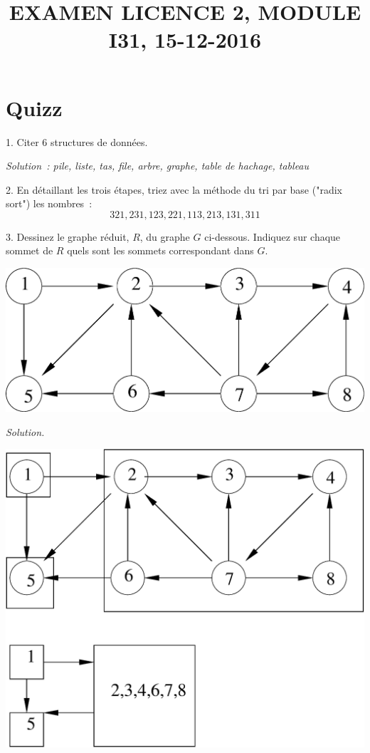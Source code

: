 \documentclass[11pt]{article}
\begin{document}
\title{EXAMEN LICENCE 2, MODULE I31, 15-12-2016}
\date{}

\maketitle
\newif\ifcorrige
\corrigetrue

\newcommand{\smallbullet}{\,\begin{picture}(-1,1)(-1,-3)\circle*{2}\end{picture}\ }


\section{Quizz}
1. Citer 6 structures de données.

\ifcorrige
{\it Solution~: pile, liste, tas, file, arbre, graphe, table de hachage, tableau}
\else
\fi

2. En détaillant les trois étapes, triez avec la méthode du tri par base ("radix sort") les nombres~:
$$321, 231, 123, 221, 113, 213, 131, 311$$

3. Dessinez le graphe réduit, $R$, du graphe $G$ ci-dessous. Indiquez sur chaque sommet de $R$ quels sont les sommets correspondant dans $G$.
\begin{center}
\includegraphics[width=0.6\linewidth]{scc.eps}
\end{center}

\ifcorrige
{\it Solution.}
\begin{center}
\includegraphics[width=0.6\linewidth]{scc_bis.eps}
\end{center}
\else
\fi
\end{document}
